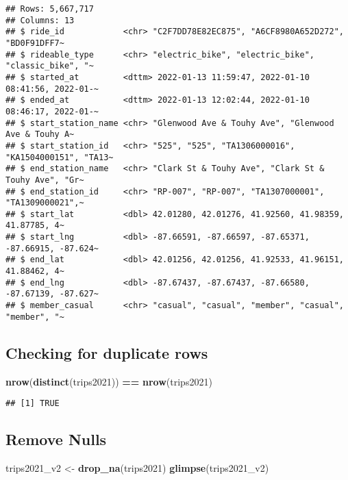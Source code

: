 \documentclass[
]{article}
\newenvironment{Shaded}{\begin{snugshade}}{\end{snugshade}}
\newcommand{\FunctionTok}[1]{\textcolor[rgb]{0.13,0.29,0.53}{\textbf{#1}}}
\newcommand{\NormalTok}[1]{#1}
\newcommand{\OtherTok}[1]{\textcolor[rgb]{0.56,0.35,0.01}{#1}}
\newcommand{\SpecialCharTok}[1]{\textcolor[rgb]{0.81,0.36,0.00}{\textbf{#1}}}
\begin{document}
\begin{verbatim}
## Rows: 5,667,717
## Columns: 13
## $ ride_id            <chr> "C2F7DD78E82EC875", "A6CF8980A652D272", "BD0F91DFF7~
## $ rideable_type      <chr> "electric_bike", "electric_bike", "classic_bike", "~
## $ started_at         <dttm> 2022-01-13 11:59:47, 2022-01-10 08:41:56, 2022-01-~
## $ ended_at           <dttm> 2022-01-13 12:02:44, 2022-01-10 08:46:17, 2022-01-~
## $ start_station_name <chr> "Glenwood Ave & Touhy Ave", "Glenwood Ave & Touhy A~
## $ start_station_id   <chr> "525", "525", "TA1306000016", "KA1504000151", "TA13~
## $ end_station_name   <chr> "Clark St & Touhy Ave", "Clark St & Touhy Ave", "Gr~
## $ end_station_id     <chr> "RP-007", "RP-007", "TA1307000001", "TA1309000021",~
## $ start_lat          <dbl> 42.01280, 42.01276, 41.92560, 41.98359, 41.87785, 4~
## $ start_lng          <dbl> -87.66591, -87.66597, -87.65371, -87.66915, -87.624~
## $ end_lat            <dbl> 42.01256, 42.01256, 41.92533, 41.96151, 41.88462, 4~
## $ end_lng            <dbl> -87.67437, -87.67437, -87.66580, -87.67139, -87.627~
## $ member_casual      <chr> "casual", "casual", "member", "casual", "member", "~
\end{verbatim}

\hypertarget{checking-for-duplicate-rows}{%
\subsection{Checking for duplicate
rows}\label{checking-for-duplicate-rows}}

\begin{Shaded}
\begin{Highlighting}[]
\FunctionTok{nrow}\NormalTok{(}\FunctionTok{distinct}\NormalTok{(trips2021)) }\SpecialCharTok{==} \FunctionTok{nrow}\NormalTok{(trips2021)}
\end{Highlighting}
\end{Shaded}

\begin{verbatim}
## [1] TRUE
\end{verbatim}

\hypertarget{remove-nulls}{%
\subsection{Remove Nulls}\label{remove-nulls}}

\begin{Shaded}
\begin{Highlighting}[]
\NormalTok{trips2021\_v2 }\OtherTok{\textless{}{-}} \FunctionTok{drop\_na}\NormalTok{(trips2021)}
\FunctionTok{glimpse}\NormalTok{(trips2021\_v2)}
\end{Highlighting}
\end{Shaded}
\end{document}
